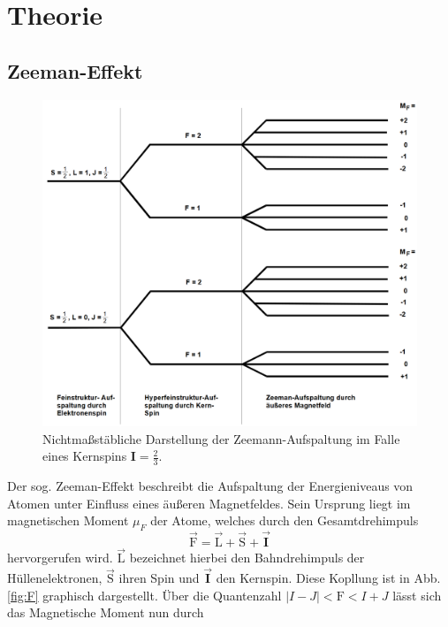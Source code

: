 \section{Theorie}
\label{sec:Theorie}

\subsection{Zeeman-Effekt}
\begin{figure}
  \includegraphics{./Niveaus.PNG}
  \caption{Nichtmaßstäbliche Darstellung der Zeemann-Aufspaltung im Falle eines Kernspins $\mathbf{I}= \frac{2}{3}$\cite{Anleitung}.}
  \label{fig:Zeemann}
\end{figure}
Der sog. Zeeman-Effekt beschreibt die Aufspaltung der Energieniveaus von Atomen unter Einfluss eines äußeren Magnetfeldes.
Sein Ursprung liegt im magnetischen Moment $\mu_F$ der Atome, welches durch den Gesamtdrehimpuls
\begin{equation}
  \vec{\text{F}}=\vec{\text{L}}+\vec{\text{S}}+\vec{\mathbf{I}}
  \label{eqn:F}
\end{equation}
hervorgerufen wird. $\vec{\text{L}}$ bezeichnet hierbei den Bahndrehimpuls der Hüllenelektronen, $\vec{\text{S}}$ ihren Spin und $\vec{\mathbf{I}}$ den Kernspin. Diese Kopllung ist in Abb. \ref{fig:F} graphisch dargestellt.
Über die Quantenzahl $|I-J|<\text{F}<I+J$ lässt sich das Magnetische Moment nun durch

